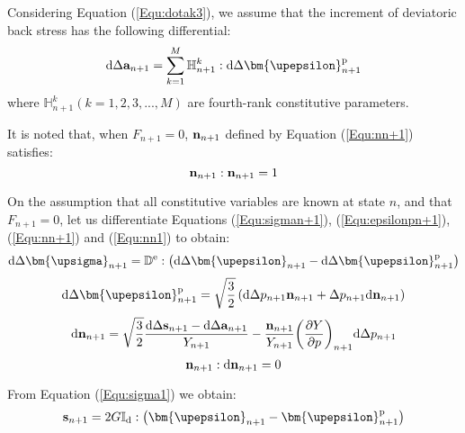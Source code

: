 Considering Equation (\ref{Equ:dotak3}), we assume that the increment of deviatoric back stress has the following differential:
\begin{equation}
\label{Equ:dan+1}
{\text{d}}\Delta {{\bf{a}}_{n + 1}} = \sum\limits_{k = 1}^M {\mathbb{H}_{n + 1}^k} :{\text{d}}\Delta {\bm{\upepsilon }}_{n + 1}^{\rm{p}}
\end{equation}
where $\mathbb{H}_{n + 1}^k( k = 1,2,3,...,M )$ are fourth-rank constitutive parameters.

It is noted that, when ${F_{n + 1}} = 0$, ${\bf{n}}_{n + 1}$ defined by Equation (\ref{Equ:nn+1}) satisfies:
\begin{equation}
\label{Equ:nn1}
{{\bf{n}}_{n + 1}}:{{\bf{n}}_{n + 1}} = 1
\end{equation}

On the assumption that all constitutive variables are known at state $n$, and that $F_{n+1}=0$, let us differentiate Equations (\ref{Equ:sigman+1}), (\ref{Equ:epsilonpn+1}), (\ref{Equ:nn+1}) and (\ref{Equ:nn1}) to obtain:
\begin{equation}
\label{Equ:dsigman+1}
{\text{d}}\Delta {{\bm{\upsigma }}_{n + 1}} = {\mathbb{D}^{\rm{e}}}:\left( {{\text{d}}\Delta {{\bm{\upepsilon }}_{n + 1}} - {\text{d}}\Delta {\bm{\upepsilon }}_{n + 1}^{\rm{p}}} \right)
\end{equation}
\begin{equation}
\label{Equ:depsilon+1}
{\text{d}}\Delta {\bm{\upepsilon }}_{n + 1}^{\rm{p}} = \sqrt {\frac{3}{2}} \left( {{\text{d}}\Delta {p_{n + 1}}{{\bf{n}}_{n + 1}} + \Delta {p_{n + 1}}{\text{d}}{{\bf{n}}_{n + 1}}} \right)
\end{equation}
\begin{equation}
\label{Equ:dnn+1}
{\text{d}}{{\bf{n}}_{n + 1}} = \sqrt {\frac{3}{2}} \frac{{{\text{d}}\Delta {{\bf{s}}_{n + 1}} - {\text{d}}\Delta {{\bf{a}}_{n + 1}}}}{{{Y_{n + 1}}}} - \frac{{{{\bf{n}}_{n + 1}}}}{{{Y_{n + 1}}}}{\left( {\frac{{\partial Y}}{{\partial p}}} \right)_{n + 1}}{\text{d}}\Delta {p_{n + 1}}
\end{equation}
\begin{equation}
{{\bf{n}}_{n + 1}}:{\text{d}}{{\bf{n}}_{n + 1}} = 0
\end{equation}

From Equation (\ref{Equ:sigma1}) we obtain:
\begin{equation}
\label{Equ:sn+1}
{{\bf{s}}_{n + 1}} = 2G{\mathbb{I}_{\rm{d}}}:\left( {{{\bm{\upepsilon }}_{n + 1}} - {\bm{\upepsilon }}_{n + 1}^{\rm{p}}} \right)
\end{equation}

